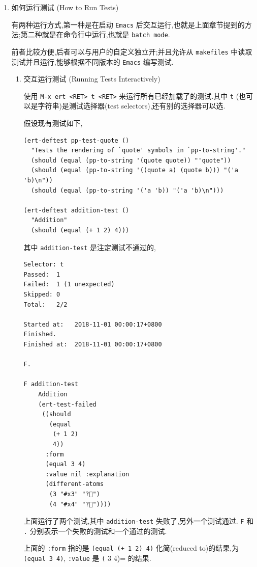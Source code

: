 \documentclass[11pt]{article}
\begin{document}
\begin{enumerate}
\item 如何运行测试 (How to Run Tests)
\label{sec:org199125e}

有两种运行方式,第一种是在启动 \texttt{Emacs} 后交互运行,也就是上面章节提到的方法;第二种就是在命令行中运行,也就是 \texttt{batch mode}.

前者比较方便,后者可以与用户的自定义独立开;并且允许从 \texttt{makefiles} 中读取测试并且运行,能够根据不同版本的 \texttt{Emacs} 编写测试.

\begin{enumerate}
\item 交互运行测试 (Running Tests Interactively)
\label{sec:orgf13b6bf}

使用 \texttt{M-x ert <RET> t <RET>} 来运行所有已经加载了的测试.其中 \texttt{t} (也可以是字符串)是测试选择器(test selectors),还有别的选择器可以选.

假设现有测试如下,

\begin{verbatim}
(ert-deftest pp-test-quote ()
  "Tests the rendering of `quote' symbols in `pp-to-string'."
  (should (equal (pp-to-string '(quote quote)) "'quote"))
  (should (equal (pp-to-string '((quote a) (quote b))) "('a 'b)\n"))
  (should (equal (pp-to-string '('a 'b)) "('a 'b)\n")))

(ert-deftest addition-test ()
  "Addition"
  (should (equal (+ 1 2) 4)))
\end{verbatim}

其中 \texttt{addition-test} 是注定测试不通过的,

\begin{verbatim}
Selector: t
Passed:  1
Failed:  1 (1 unexpected)
Skipped: 0
Total:   2/2

Started at:   2018-11-01 00:00:17+0800
Finished.
Finished at:  2018-11-01 00:00:17+0800

F.

F addition-test
    Addition
    (ert-test-failed
     ((should
       (equal
        (+ 1 2)
        4))
      :form
      (equal 3 4)
      :value nil :explanation
      (different-atoms
       (3 "#x3" "?")
       (4 "#x4" "?"))))
\end{verbatim}

上面运行了两个测试,其中 \texttt{addition-test} 失败了,另外一个测试通过. \texttt{F} 和 \texttt{.} 分别表示一个失败的测试和一个通过的测试.

上面的 \texttt{:form} 指的是 \texttt{(equal (+ 1 2) 4)} 化简(reduced to)的结果,为 \texttt{(equal 3 4)}, \texttt{:value} 是 \texttt{(} 3 4)= 的结果.


\end{enumerate}
\end{enumerate}
\end{document}
